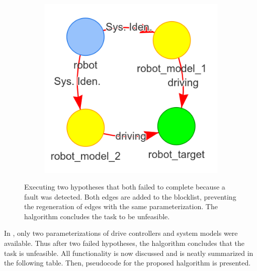 \begin{figure}[H]
    \begin{subfigure}{.3\textwidth}
    \centering
    \includegraphics[width=1\textwidth]{figures/proposed_method/connecting_nodes/failure/fail_7}
    \end{subfigure}
    \hfill
    \caption{Executing two hypotheses that both failed to complete because a fault was detected. Both edges are added to the blocklist, preventing the regeneration of edges with the same parameterization. The \ac{halgorithm} concludes the task to be unfeasible.}%
    \label{fig:failure_in_hgraph}
\end{figure}

In , only two parameterizations of drive controllers and system models were available. Thus after two failed hypotheses, the \ac{halgorithm} concludes that the task is unfeasible. All functionality is now discussed and is neatly summarized in the following table. Then, pseudocode for the proposed \ac{halgorithm} is presented.\bs

